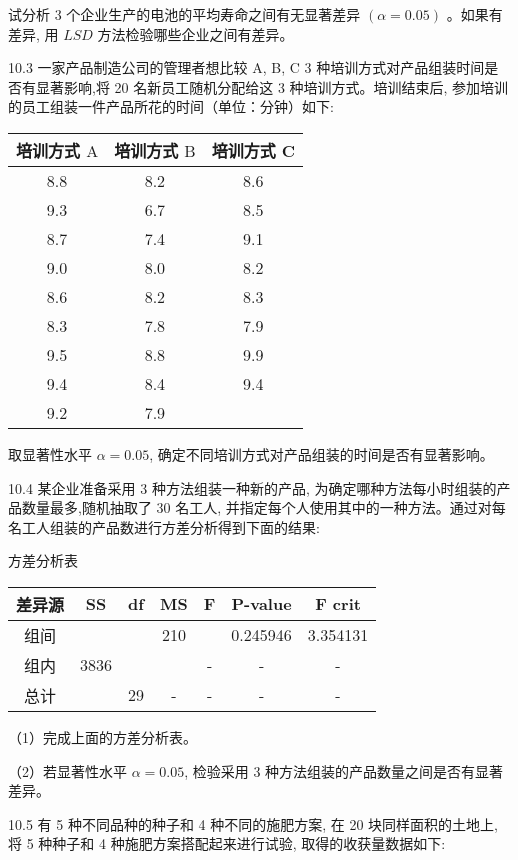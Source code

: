 \documentclass[10pt]{article}
\begin{document}
\begin{CJK*}{UTF8}{bsmi}
试分析 3 个企业生产的电池的平均寿命之间有无显著差异 $(\alpha=0.05)$ 。如果有差异, 用 $L S D$ 方法检验哪些企业之间有差异。

10.3 一家产品制造公司的管理者想比较 A, B, C 3 种培训方式对产品组装时间是否有显著影响,将 20 名新员工随机分配给这 3 种培训方式。培训结束后, 参加培训的员工组装一件产品所花的时间（单位：分钟）如下:

\begin{center}
\begin{tabular}{ccc}
\hline
培训方式 $\mathrm{A}$ & 培训方式 $\mathrm{B}$ & 培训方式 C \\
\hline
8.8 & 8.2 & 8.6 \\
9.3 & 6.7 & 8.5 \\
8.7 & 7.4 & 9.1 \\
9.0 & 8.0 & 8.2 \\
8.6 & 8.2 & 8.3 \\
8.3 & 7.8 & 7.9 \\
9.5 & 8.8 & 9.9 \\
9.4 & 8.4 & 9.4 \\
9.2 & 7.9 &  \\
\hline
\end{tabular}
\end{center}

取显著性水平 $\alpha=0.05$, 确定不同培训方式对产品组装的时间是否有显著影响。

10.4 某企业准备采用 3 种方法组装一种新的产品, 为确定哪种方法每小时组装的产品数量最多,随机抽取了 30 名工人, 并指定每个人使用其中的一种方法。通过对每名工人组装的产品数进行方差分析得到下面的结果:

方差分析表

\begin{center}
\begin{tabular}{c|c|c|c|c|c|c}
\hline
差异源 & SS & df & MS & F & P-value & F crit \\
\hline
组间 &  &  & 210 &  & 0.245946 & 3.354131 \\
组内 & 3836 &  &  & - & - & - \\
总计 &  & 29 & - & - & - & - \\
\hline
\end{tabular}
\end{center}

（1）完成上面的方差分析表。

（2）若显著性水平 $\alpha=0.05$, 检验采用 3 种方法组装的产品数量之间是否有显著差异。

10.5 有 5 种不同品种的种子和 4 种不同的施肥方案, 在 20 块同样面积的土地上, 将 5 种种子和 4 种施肥方案搭配起来进行试验, 取得的收获量数据如下:


\end{CJK*}
\end{document}
